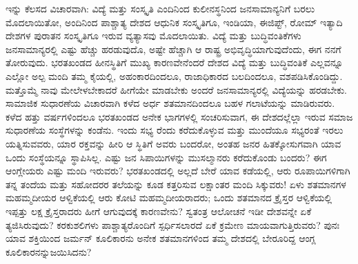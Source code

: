 {\fontsize{12.5}{11}}

ಇನ್ನು ಕೆಲಸದ ವಿಚಾರವಾಗಿ: ವಿದ್ಯೆ ಮತ್ತು ಸಂಸ್ಕೃತಿ ಎಂದಿನಿಂದ ಕುಲೀನಸ್ಥನಿಂದ ಜನಸಾಮಾನ್ಯನಿಗೆ ಬರಲು ಮೊದಲಾಯಿತೋ, ಅಂದಿನಿಂದ ಪಾಶ್ಚಾತ್ಯ ದೇಶದ ಆಧುನಿಕ ಸಂಸ್ಕೃತಿಗೂ, ಇಂಡಿಯಾ, ಈಜಿಪ್ಟ್, ರೋಮ್ ಇತ್ಯಾದಿ ದೇಶಗಳ ಪುರಾತನ ಸಂಸ್ಕೃತಿಗೂ ಇರುವ ವ್ಯತ್ಯಾಸವು ಮೊದಲಾಯಿತು. ವಿದ್ಯೆ ಮತ್ತು ಬುದ್ಧಿವಂತಿಕೆಗಳು ಜನಸಾಮಾನ್ಯರಲ್ಲಿ ಎಷ್ಟು ಹೆಚ್ಚು ಹರಡುವುದೊ, ಅಷ್ಟೇ ಹೆಚ್ಚಾಗಿ ಆ ರಾಷ್ಟ್ರ ಅಭಿವೃದ್ಧಿಯಾಗುವುದೆಂದು, ಈಗ ನನಗೆ ತೋರುವುದು. ಭರತಖಂಡದ ಹೀನಸ್ಥಿತಿಗೆ ಮುಖ್ಯ ಕಾರಣವೇನೆಂದರೆ ದೇಶದ ವಿದ್ಯೆ ಮತ್ತು ಬುದ್ಧಿವಂತಿಕೆ ಎಲ್ಲವನ್ನೂ ಎಲ್ಲೋ ಅಲ್ಪ ಮಂದಿ ತಮ್ಮ ಕೈಯಲ್ಲಿ, ಅಹಂಕಾರದಿಂದಲೂ, ರಾಜಾಧಿಕಾರದ ಬಲದಿಂದಲೂ, ವಶಪಡಿಸಿಕೊಂಡಿದ್ದು. ಮತ್ತೊಮ್ಮೆ ನಾವು ಮೇಲೇಳಬೇಕಾದರೆ ಹೀಗೆಯೇ ಮಾಡಬೇಕು\enginline{-} ಅಂದರೆ ಜನಸಾಮಾನ್ಯರಲ್ಲಿ ವಿದ್ಯೆಯನ್ನು ಹರಡಬೇಕು. ಸಾಮಾಜಿಕ ಸುಧಾರಣೆಯ ವಿಚಾರವಾಗಿ ಕಳೆದ ಅರ್ಧ ಶತಮಾನದಿಂದಲೂ ಬಹಳ ಗಲಾಟೆಯನ್ನು ಮಾಡಿರುವರು. ಕಳೆದ ಹತ್ತು ವರ್ಷಗಳಿಂದಲೂ ಭರತಖಂಡದ ಅನೇಕ ಭಾಗಗಳಲ್ಲಿ ಸಂಚರಿಸುವಾಗ, ಈ ದೇಶದಲ್ಲೆಲ್ಲಾ ಇರುವ ಸಮಾಜ ಸುಧಾರಣೆಯ ಸಂಸ್ಥೆಗಳನ್ನು ಕಂಡೆನು. ಇಂದು ಸಭ್ಯ  ರೆಂದು ಕರೆದುಕೊಳ್ಳುವ ಮತ್ತು ಮುಂದೆಯೂ ಸಭ್ಯರಂತೆ ಇರಲು ಯತ್ನಿಸುವವರು, ಯಾರ ರಕ್ತವನ್ನು ಹೀರಿ ಆ ಸ್ಥಿತಿಗೆ ಅವರು ಬಂದರೋ, ಅಂತಹ ಜನರ ಹಿತಕ್ಕೋಸುಗವಾಗಿ ಯಾವ ಒಂದು ಸಂಸ್ಥೆಯನ್ನೂ ಸ್ಥಾಪಿಸಿಲ್ಲ. ಎಷ್ಟು ಜನ ಸಿಪಾಯಿಗಳನ್ನು ಮುಸಲ್ಮಾನರು ಕರೆದುಕೊಂಡು ಬಂದರು? ಈಗ ಆಂಗ್ಲೇಯರು ಎಷ್ಟು ಮಂದಿ ಇರುವರು? ಭರತಖಂಡದಲ್ಲಿ ಅಲ್ಲದೆ ಬೇರೆ ಯಾವ ಕಡೆಯಲ್ಲಿ, ಆರು ರೂಪಾಯಿಗಳಿಗಾಗಿ ತನ್ನ ತಂದೆಯ ಮತ್ತು ಸಹೋದರರ ತಲೆಯನ್ನು ಕೂಡ ಕತ್ತರಿಸುವ ಲಕ್ಷಾಂತರ ಮಂದಿ ಸಿಕ್ಕುವರು! ಏಳು ಶತಮಾನಗಳ ಮಹಮ್ಮದೀಯರ ಆಳ್ವಿಕೆಯಲ್ಲಿ ಆರು ಕೋಟಿ ಮಹಮ್ಮದೀಯರಾದರು; ಒಂದು ಶತಮಾನದ ಕ್ರೈಸ್ತರ ಆಳ್ವಿಕೆಯಲ್ಲಿ ಇಪ್ಪತ್ತು ಲಕ್ಷ ಕ್ರೈಸ್ತರಾದರು \enginline{-} ಹೀಗೆ ಆಗುವುದಕ್ಕೆ ಕಾರಣವೇನು? ಸ್ವತಂತ್ರ ಆಲೋಚನೆ ಇಡೀ ದೇಶವನ್ನೇ ಏಕೆ ತ್ಯಜಿಸಿರುವುದು? ಕರಕುಶಲಿಗಳು ಪಾಶ್ಚಾತ್ಯರೊಂದಿಗೆ ಸ್ಪರ್ಧಿಸಲಾರದೆ ಏಕೆ ಕ್ರಮೇಣ ಮಾಯವಾಗುತ್ತಿರುವರು? ಪುನಃ ಯಾವ ಶಕ್ತಿಯಿಂದ ಜರ್ಮನ್ ಕೂಲಿಕಾರನು ಅನೇಕ ಶತಮಾನಗಳಿಂದ ತಮ್ಮ ದೇಶದಲ್ಲಿ ಬೇರೂರಿದ್ದ ಆಂಗ್ಲ ಕೂಲಿಕಾರನನ್ನು\break ಜಯಿಸಿದನು?

